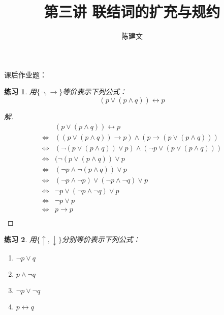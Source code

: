 \documentclass{article}
\newtheorem{Exercise}{练习}
\begin{document}
\begin{CJK*}{UTF8}{gbsn}
  \title{第三讲 联结词的扩充与规约}
  \author{陈建文}
  \maketitle

  课后作业题：
  \begin{Exercise}
    用$\{\lnot,\to\}$等价表示下列公式：
    \[(p\lor(p\land q))\leftrightarrow p\]
  \end{Exercise}

  \begin{proof}[解]
    \begin{align*}
      &(p\lor(p\land q))\leftrightarrow p\\
      \Leftrightarrow&((p\lor(p\land q))\to p)\land (p\to (p\lor(p\land q)))\\
      \Leftrightarrow&(\lnot (p\lor(p\land q))\lor p)\land (\lnot p \lor (p\lor(p\land q)))\\
      \Leftrightarrow&(\lnot (p\lor(p\land q))\lor p\\
      \Leftrightarrow&(\lnot p \land \lnot (p\land q))\lor p\\
      \Leftrightarrow&(\lnot p\land \lnot p)\lor (\lnot p\land \lnot q)\lor p\\
      \Leftrightarrow&\lnot p\lor (\lnot p\land \lnot q)\lor p\\
      \Leftrightarrow&\lnot p \lor p\\
      \Leftrightarrow&p \to p\\
    \end{align*}
    
  \end{proof}
  \begin{Exercise}
    用$\{\uparrow, \downarrow \}$分别等价表示下列公式：
    \begin{enumerate}
      \item $\lnot p\lor q$
      \item $p\land \lnot q$
      \item $\lnot p \lor \lnot q$
      \item $p\leftrightarrow q$
    \end{enumerate}
    
  \end{Exercise}


\end{CJK*}
\end{document}
